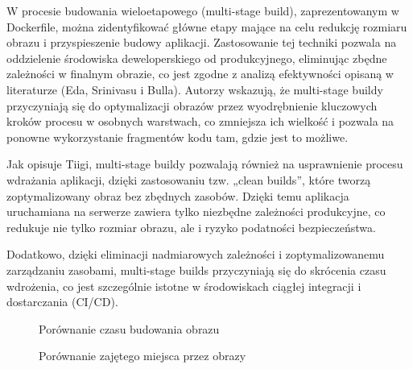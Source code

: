 \documentclass{article}
\begin{document}
W procesie budowania wieloetapowego (multi-stage build), zaprezentowanym w Dockerfile, można zidentyfikować główne etapy mające na celu redukcję rozmiaru obrazu i przyspieszenie budowy aplikacji. Zastosowanie tej techniki pozwala na oddzielenie środowiska deweloperskiego od produkcyjnego, eliminując zbędne zależności w finalnym obrazie, co jest zgodne z analizą efektywności opisaną w literaturze (Eda, Srinivasu i Bulla)\cite{efficientDocker}. Autorzy wskazują, że multi-stage buildy przyczyniają się do optymalizacji obrazów przez wyodrębnienie kluczowych kroków procesu w osobnych warstwach, co zmniejsza ich wielkość i pozwala na ponowne wykorzystanie fragmentów kodu tam, gdzie jest to możliwe.

Jak opisuje Tiigi\cite{smallerContainers}, multi-stage buildy pozwalają również na usprawnienie procesu wdrażania aplikacji, dzięki zastosowaniu tzw. „clean builds”, które tworzą zoptymalizowany obraz bez zbędnych zasobów. Dzięki temu aplikacja uruchamiana na serwerze zawiera tylko niezbędne zależności produkcyjne, co redukuje nie tylko rozmiar obrazu, ale i ryzyko podatności bezpieczeństwa.

Dodatkowo, dzięki eliminacji nadmiarowych zależności i zoptymalizowanemu zarządzaniu zasobami, multi-stage builds przyczyniają się do skrócenia czasu wdrożenia, co jest szczególnie istotne w środowiskach ciągłej integracji i dostarczania (CI/CD)\cite{reduceDockerImages}.

\begin{figure}[H]
\centering
{}
\caption{Porównanie czasu budowania obrazu}
\label{fig:czas}
\end{figure}

\begin{figure}[H]
\centering
{}
\caption{Porównanie zajętego miejsca przez obrazy}
\label{fig:miejsce}
\end{figure}
\end{document}
